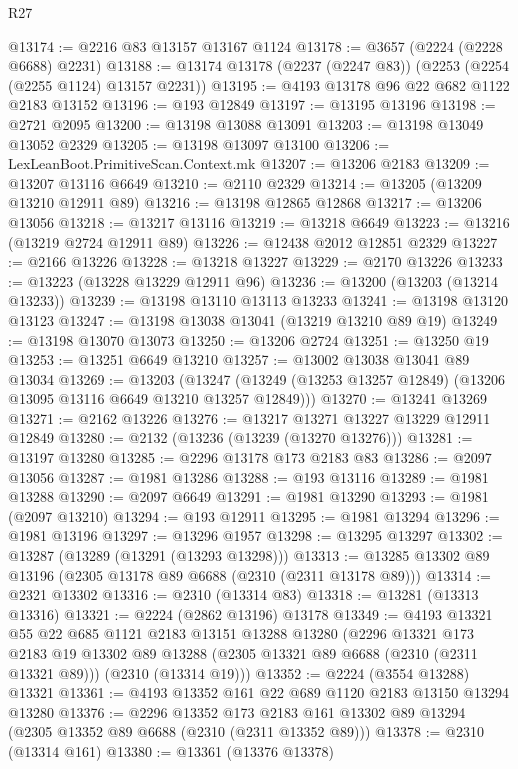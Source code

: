 \begin{lexlean}{R27}
\begin{coremodule}
@13174 := @2216 @83 @13157 @13167 @1124
@13178 := @3657 (@2224 (@2228 @6688) @2231)
@13188 := @13174 @13178 (@2237 (@2247 @83)) (@2253 (@2254 (@2255 @1124) @13157 @2231))
@13195 := @4193 @13178 @96 @22 @682 @1122 @2183 @13152
@13196 := @193 @12849
@13197 := @13195 @13196
@13198 := @2721 @2095
@13200 := @13198 @13088 @13091
@13203 := @13198 @13049 @13052 @2329
@13205 := @13198 @13097 @13100
@13206 := LexLeanBoot.PrimitiveScan.Context.mk
@13207 := @13206 @2183
@13209 := @13207 @13116 @6649
@13210 := @2110 @2329
@13214 := @13205 (@13209 @13210 @12911 @89)
@13216 := @13198 @12865 @12868
@13217 := @13206 @13056
@13218 := @13217 @13116
@13219 := @13218 @6649
@13223 := @13216 (@13219 @2724 @12911 @89)
@13226 := @12438 @2012 @12851 @2329
@13227 := @2166 @13226
@13228 := @13218 @13227
@13229 := @2170 @13226
@13233 := @13223 (@13228 @13229 @12911 @96)
@13236 := @13200 (@13203 (@13214 @13233))
@13239 := @13198 @13110 @13113 @13233
@13241 := @13198 @13120 @13123
@13247 := @13198 @13038 @13041 (@13219 @13210 @89 @19)
@13249 := @13198 @13070 @13073
@13250 := @13206 @2724
@13251 := @13250 @19
@13253 := @13251 @6649 @13210
@13257 := @13002 @13038 @13041 @89 @13034
@13269 := @13203
    (@13247 (@13249 (@13253 @13257 @12849) (@13206 @13095 @13116 @6649 @13210 @13257 @12849)))
@13270 := @13241 @13269
@13271 := @2162 @13226
@13276 := @13217 @13271 @13227 @13229 @12911 @12849
@13280 := @2132 (@13236 (@13239 (@13270 @13276)))
@13281 := @13197 @13280
@13285 := @2296 @13178 @173 @2183 @83
@13286 := @2097 @13056
@13287 := @1981 @13286
@13288 := @193 @13116
@13289 := @1981 @13288
@13290 := @2097 @6649
@13291 := @1981 @13290
@13293 := @1981 (@2097 @13210)
@13294 := @193 @12911
@13295 := @1981 @13294
@13296 := @1981 @13196
@13297 := @13296 @1957
@13298 := @13295 @13297
@13302 := @13287 (@13289 (@13291 (@13293 @13298)))
@13313 := @13285 @13302 @89 @13196 (@2305 @13178 @89 @6688 (@2310 (@2311 @13178 @89)))
@13314 := @2321 @13302
@13316 := @2310 (@13314 @83)
@13318 := @13281 (@13313 @13316)
@13321 := @2224 (@2862 @13196) @13178
@13349 := @4193
    @13321
    @55
    @22
    @685
    @1121
    @2183
    @13151
    @13288
    @13280
    (@2296
      @13321
      @173
      @2183
      @19
      @13302
      @89
      @13288
      (@2305 @13321 @89 @6688 (@2310 (@2311 @13321 @89)))
      (@2310 (@13314 @19)))
@13352 := @2224 (@3554 @13288) @13321
@13361 := @4193 @13352 @161 @22 @689 @1120 @2183 @13150 @13294 @13280
@13376 := @2296
    @13352
    @173
    @2183
    @161
    @13302
    @89
    @13294
    (@2305 @13352 @89 @6688 (@2310 (@2311 @13352 @89)))
@13378 := @2310 (@13314 @161)
@13380 := @13361 (@13376 @13378)

\end{coremodule}
\end{lexlean}
